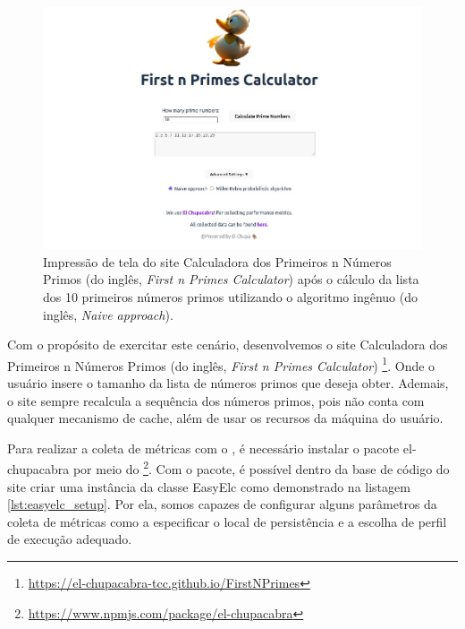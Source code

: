 \documentclass[12pt]{tcc}
\begin{document}
	\begin{figure}[!ht]
		\centering
		\includegraphics[width=1\textwidth]{figures/print-elc-numeros-primos.jpeg}
		\caption[Impressão de tela do site Calculadora dos Primeiros n Números Primos]{Impressão de tela do site Calculadora dos Primeiros n Números Primos (do inglês, \emph{First n Primes Calculator}) após o cálculo da lista dos 10 primeiros números primos utilizando o algoritmo ingênuo (do inglês, \emph{Naive approach}).}
		\label{fig:site-numeros-primos}
	\end{figure}

	Com o propósito de exercitar este cenário, desenvolvemos o site Calculadora dos Primeiros n Números Primos (do inglês, \emph{First n Primes Calculator})
	\footnote{\url{https://el-chupacabra-tcc.github.io/FirstNPrimes}}.
	Onde o usuário insere o tamanho da lista de números primos que deseja obter.
	Ademais, o site sempre recalcula a sequência dos números primos, pois não conta com qualquer mecanismo de cache, além de usar os recursos da máquina do usuário.

	Para realizar a coleta de métricas com o , é necessário instalar o pacote el-chupacabra por meio do \footnote{\url{https://www.npmjs.com/package/el-chupacabra}}.
	Com o pacote, é possível dentro da base de código do site criar uma instância da classe EasyElc como demonstrado na listagem \ref{lst:easyelc_setup}.
	Por ela, somos capazes de configurar alguns parâmetros da coleta de métricas como a especificar o local de persistência e a escolha de perfil de execução adequado.
\end{document}
